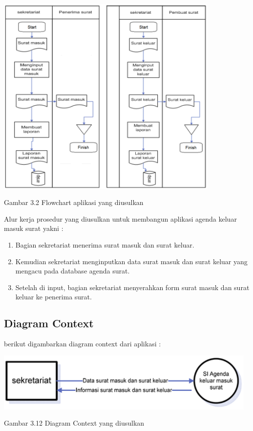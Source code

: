\documentclass{jtetiproposalskripsi}
\begin{document}
\includegraphics[width=11cm]{gambar/FlowchartAMSdiusulkan.png} 

Gambar 3.2 Flowchart aplikasi yang diusulkan

Alur kerja prosedur yang diusulkan untuk membangun aplikasi agenda keluar masuk surat yakni :

\begin{enumerate}
\item Bagian sekretariat menerima surat masuk dan surat keluar.
\item Kemudian sekretariat menginputkan data surat masuk dan surat keluar yang mengacu pada database agenda surat.
\item Setelah di input, bagian sekretariat menyerahkan form surat masuk dan surat keluar ke penerima surat.
\end{enumerate}

\subsection{Diagram Context}

berikut digambarkan diagram context dari aplikasi :

\includegraphics[width=13cm]{gambar/DiagramContext.png} 

Gambar 3.12 Diagram Context yang diusulkan
\end{document}
